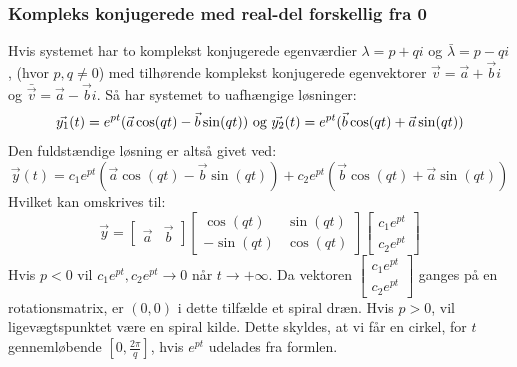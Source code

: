 \subsubsection{Kompleks konjugerede med real-del forskellig fra 0}
Hvis systemet har to komplekst konjugerede egenværdier $\lambda = p+qi$ og $\bar{\lambda}=p-qi$, (hvor $p,q \neq 0$) med tilhørende komplekst konjugerede egenvektorer $\vec{v}=\vec{a}+\vec{b}i$ og $\bar{\vec{v}}=\vec{a}-\vec{b}i$. Så har systemet to uafhængige løsninger:
\begin{equation*}
    \vec{y_1}(t)=e^{pt}(\vec{a}\cos(qt)-\vec{b}\sin(qt)) \ \textnormal{og} \ \vec{y_2}(t)=e^{pt}(\vec{b}\cos(qt)+\vec{a}\sin(qt))
\end{equation*}
Den fuldstændige løsning er altså givet ved:
\begin{equation*}
    \vec{y}(t)=c_1e^{pt}(\vec{a}\cos(qt)-\vec{b}\sin(qt))+c_2e^{pt}(\vec{b}\cos(qt)+\vec{a}\sin(qt))
\end{equation*}
Hvilket kan omskrives til:
\begin{equation*}
    \vec{y}=\begin{bmatrix}
        \vec{a} & \vec{b}
    \end{bmatrix} \begin{bmatrix}
        \cos(qt) & \sin(qt) \\
        -\sin(qt) & \cos(qt)
    \end{bmatrix} \begin{bmatrix}
        c_1e^{pt} \\
        c_2e^{pt}
    \end{bmatrix}
\end{equation*}
Hvis $p<0$ vil  $c_1e^{pt},c_2e^{pt} \to 0$ når $t \to +\infty$. Da vektoren $\begin{bmatrix}
        c_1e^{pt} \\
        c_2e^{pt}
    \end{bmatrix}$ ganges på en rotationsmatrix, er $(0,0)$ i dette tilfælde et spiral dræn. Hvis $p>0$, vil ligevægtspunktet være en spiral kilde. Dette skyldes, at vi får en cirkel, for $t$ gennemløbende $[0,\frac{2\pi}{q}]$, hvis $e^{pt}$ udelades fra formlen. 
